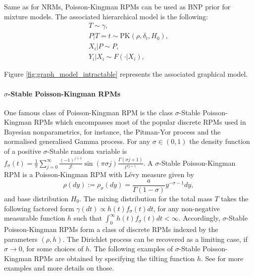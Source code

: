 Same as for \glspl{NRM}, Poisson-Kingman \glspl{RPM} can be used as \gls{BNP} prior for mixture models. The associated hierarchical model is the following:
\begin{gather*}
T \sim \gamma, \\
P|T=t \sim \text{PK}(\rho, \delta_t, H_0), \\
X_i|P \sim P, \\
Y_i|X_i \sim F(\cdot|X_i),
\end{gather*}

Figure \ref{fig:graph_model_intractable} represents the associated graphical model.

\paragraph{$\sigma$-Stable Poisson-Kingman \glspl{RPM}}
One famous class of Poisson-Kingman \gls{RPM} is the class $\sigma$-Stable Poisson-Kingman \glspl{RPM} which encompasses most of the popular discrete \glspl{RPM} used in Bayesian nonparametrics, for instance, the Pitman-Yor process and the normalised generalised Gamma process.
For any $\sigma \in (0,1)$ the density function of a positive  $\sigma$-Stable random variable is
$f_\sigma(t) = \frac{1}{\pi}\sum_{j=0}^\infty \frac{(-1)^{j+1}}{j!}\sin(\pi\sigma j)\frac{\Gamma(\sigma j+1)}{t^{\sigma j+1}}$. A $\sigma$-Stable Poisson-Kingman \gls{RPM} is a Poisson-Kingman \gls{RPM} with Lévy measure given by
\begin{equation} \label{eq:sigma_stable_PK}
\rho(dy) := \rho_\sigma(dy) = \frac{a}{\Gamma(1 - \sigma)}y^{-\sigma-1} dy,
\end{equation}
and base distribution $H_0$.
The mixing distribution for the total mass $T$ takes the following factored form
$\gamma(dt) \propto h(t) f_\sigma(t) dt$, for any non-negative measurable function $h$ such that
$\int_0^\infty{h(t)f_\sigma(t) dt} < \infty$.
Accordingly, $\sigma$-Stable Poisson-Kingman \glspl{RPM} form a class of discrete \glspl{RPM} indexed by the parameters $(\rho, h)$. The Dirichlet process can be recovered as a limiting case, if $\sigma \rightarrow 0$, for some choices of $h$. The following examples of $\sigma$-Stable Poisson-Kingman \glspl{RPM}  are obtained by specifying the tilting function $h$. See \cite{LomeliThesis} for more examples and more details on those.

